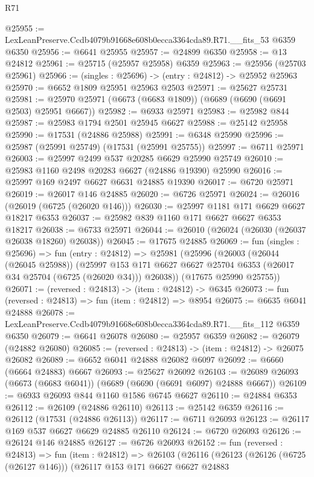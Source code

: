 \begin{lexlean}{R71}
\begin{coremodule}
@25955 := LexLeanPreserve.Ccdb4079b91668e608b0ecca3364cda89.R71.__fits_53 @6359 @6350
@25956 := @6641 @25955
@25957 := @24899 @6350
@25958 := @13 @24812
@25961 := @25715 (@25957 @25958) @6359
@25963 := @25956 (@25703 @25961)
@25966 := (singles : @25696) -> (entry : @24812) -> @25952 @25963
@25970 := @6652 @1809 @25951 @25963 @2503
@25971 := @25627 @25731
@25981 := @25970 @25971 (@6673 (@6683 @1809)) (@6689 (@6690 (@6691 @2503) @25951 @6667))
@25982 := @6933 @25971
@25983 := @25982 @844
@25987 := @25983 @1794 @2501 @25945 @6627
@25988 := @25142 @25958
@25990 := @17531 (@24886 @25988)
@25991 := @6348 @25990
@25996 := @25987 (@25991 @25749) (@17531 (@25991 @25755))
@25997 := @6711 @25971
@26003 := @25997 @2499 @537 @20285 @6629 @25990 @25749
@26010 := @25983 @1160 @2498 @20283 @6627 (@24886 @19390) @25990
@26016 := @25997 @169 @2497 @6627 @6631 @24885 @19390
@26017 := @6720 @25971
@26019 := @26017 @146 @24885
@26020 := @6726 @25971
@26024 := @26016 (@26019 (@6725 (@26020 @146)))
@26030 := @25997 @1181 @171 @6629 @6627 @18217 @6353
@26037 := @25982 @839 @1160 @171 @6627 @6627 @6353 @18217
@26038 := @6733 @25971
@26044 := @26010 (@26024 (@26030 (@26037 @26038 @18260) @26038))
@26045 := @17675 @24885
@26069 := fun (singles : @25696) =>
  fun (entry : @24812) =>
  @25981
    (@25996
      (@26003
        (@26044 (@26045 @25988))
        (@25997 @153 @171 @6627 @6627 @25704 @6353 (@26017 @34 @25704 (@6725 (@26020 @34))) @26038))
      (@17675 @25990 @25755))
@26071 := (reversed : @24813) -> (item : @24812) -> @6345
@26073 := fun (reversed : @24813) => fun (item : @24812) => @8954
@26075 := @6635 @6041 @24888
@26078 := LexLeanPreserve.Ccdb4079b91668e608b0ecca3364cda89.R71.__fits_112 @6359 @6350
@26079 := @6641 @26078
@26080 := @25957 @6359
@26082 := @26079 (@24882 @26080)
@26085 := (reversed : @24813) -> (item : @24812) -> @26075 @26082
@26089 := @6652 @6041 @24888 @26082 @6097
@26092 := @6660 (@6664 @24883) @6667
@26093 := @25627 @26092
@26103 := @26089 @26093 (@6673 (@6683 @6041)) (@6689 (@6690 (@6691 @6097) @24888 @6667))
@26109 := @6933 @26093 @844 @1160 @1586 @6745 @6627
@26110 := @24884 @6353
@26112 := @26109 (@24886 @26110)
@26113 := @25142 @6359
@26116 := @26112 (@17531 (@24886 @26113))
@26117 := @6711 @26093
@26123 := @26117 @169 @537 @6627 @6629 @24885 @26110
@26124 := @6720 @26093
@26126 := @26124 @146 @24885
@26127 := @6726 @26093
@26152 := fun (reversed : @24813) =>
  fun (item : @24812) =>
  @26103
    (@26116
      (@26123
        (@26126 (@6725 (@26127 @146)))
        (@26117
          @153
          @171
          @6627
          @6627
          @24883

\end{coremodule}
\end{lexlean}
